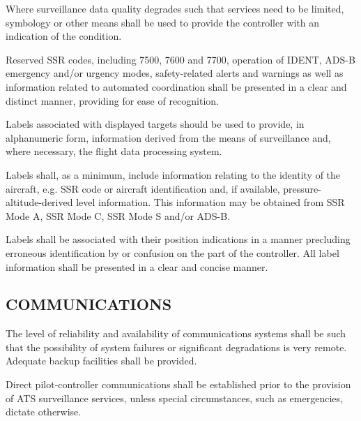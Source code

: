 \begin{enumnoss}
    \item Where surveillance data quality degrades such that services need to be limited, symbology or other means shall be used to provide the controller with an indication of the condition.
    \item Reserved SSR codes, including 7500, 7600 and 7700, operation of IDENT, ADS-B emergency and/or urgency modes, safety-related alerts and warnings as well as information related to automated coordination shall be presented in a clear and distinct manner, providing for ease of recognition.
    \item Labels associated with displayed targets should be used to provide, in alphanumeric form, information derived from the means of surveillance and, where necessary, the flight data processing system.
    \item Labels shall, as a minimum, include information relating to the identity of the aircraft, e.g. SSR code or aircraft identification and, if available, pressure-altitude-derived level information. This information may be obtained from SSR Mode A, SSR Mode C, SSR Mode S and/or ADS-B.
    \item Labels shall be associated with their position indications in a manner precluding erroneous identification by or confusion on the part of the controller. All label information shall be presented in a clear and concise manner.
\end{enumnoss}

\subsection[Communications]{COMMUNICATIONS}

\begin{enumnoss}
    \item The level of reliability and availability of communications systems shall be such that the possibility of system failures or significant degradations is very remote. Adequate backup facilities shall be provided.
    \item Direct pilot-controller communications shall be established prior to the provision of ATS surveillance services, unless special circumstances, such as emergencies, dictate otherwise.
\end{enumnoss}

